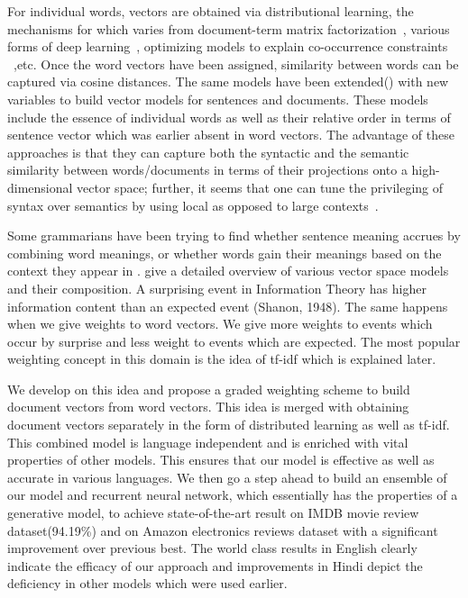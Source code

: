 \documentclass[11pt,a4paper]{article}
\begin{document}
For individual words, vectors are obtained via distributional learning, the mechanisms for which varies from document-term matrix factorization~\cite{Landauer:97}, various forms of deep learning~\cite{Collobert:08,Turian:10,Socher:13}, optimizing models to explain co-occurrence constraints ~\cite{Mikolov:13a,Pennington:14},etc. Once the word vectors have been assigned, similarity between words can be captured via cosine distances. The same models have been extended(\cite{Le:14}) with new variables to build vector models for sentences and documents. These models include the essence of individual words as well as their relative order in terms of sentence vector which was earlier absent in word vectors. The advantage of these approaches is that they can capture both the syntactic and the semantic similarity between words/documents in terms of their projections onto a high-dimensional vector space; further, it seems that one can tune the privileging of syntax over semantics by using local as opposed to large contexts~\cite{Huang:12}.

Some grammarians have been trying to find whether sentence meaning accrues by combining word meanings, or whether words gain their meanings based on the context they appear in \cite{Matilal:90}. 
\cite{Turney:10} give a detailed overview of various vector space models and their composition. A surprising event in Information Theory has higher information content than an expected event (Shanon, 1948). The same happens when we give weights to word vectors. We give more weights to events which occur by surprise and less weight to events which are expected. The most popular weighting concept in this domain is the idea of tf-idf which is explained later.

We develop on this idea and propose a graded weighting scheme to build document vectors from word vectors. This idea is merged with obtaining document vectors separately in the form of distributed learning as well as tf-idf. This combined model is language independent and is enriched with vital properties of other models. This ensures that our model is effective as well as accurate in various languages. 
We then go a step ahead to build an ensemble of our model and recurrent neural network, which essentially has the properties of a generative model, to achieve state-of-the-art result on IMDB movie review dataset(94.19\%) and on Amazon electronics reviews dataset with a significant improvement over previous best.
The world class results in English clearly indicate the efficacy of our approach and improvements in Hindi depict the deficiency in other models which were used earlier.
\end{document}
